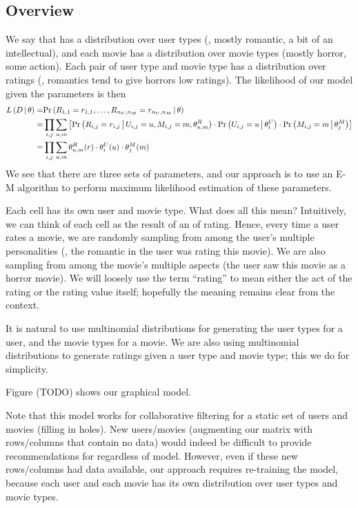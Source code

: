 \documentclass{article}
\begin{document}
\subsection{Overview}

We say that  has a distribution over user types (\eg,
mostly romantic, a bit of an intellectual), and each movie has a
distribution over movie types (mostly horror, some action). Each pair
of user type and movie type has a distribution over ratings (\eg,
romantics tend to give horrors low ratings). The likelihood of
our model given the parameters is then
\begin{align}
  {\ensuremath{ L \left( D \,\middle|\, \theta \right) }}
  =& {{\Pr \left(   R_{1,1} = r_{1,1}, \dots, R_{n_U,n_M} = r_{n_U,n_M}  \,\middle|\, 
    \theta   \right)}} \\
  =& \prod_{i,j} \sum_{u,m} \left[
    {{\Pr \left(   R_{i,j} = r_{i,j}  \,\middle|\,  U_{i,j} = u, M_{i,j} = m,
      \theta^R_{u,m}   \right)}} \cdot 
    {{\Pr \left(   U_{i,j} = u  \,\middle|\,  \theta^U_i   \right)}} \cdot
    {{\Pr \left(   M_{i,j} = m  \,\middle|\,  \theta^M_j   \right)}}
  \right] \\
  =& \prod_{i,j} \sum_{u,m}
  \theta^R_{u,m}(r) \cdot \theta^U_i(u) \cdot \theta^M_j(m)
\end{align}
We see that there are three sets of parameters, and our approach is to
use an E-M algorithm to perform maximum likelihood estimation of these
parameters.

Each cell has its own user and movie type. What does all this mean?
Intuitively, we can think of each cell as the result of an 
of rating. Hence, every time a user rates a movie, we are randomly
sampling from among the user's multiple personalities (\eg, the
romantic in the user was rating this movie). We are also sampling from
among the movie's multiple aspects (the user saw this movie as a
horror movie). We will loosely use the term ``rating'' to mean either
the act of the rating or the rating value itself; hopefully the
meaning remains clear from the context.

It is natural to use multinomial distributions for generating the user
types for a user, and the movie types for a movie. We are also using
multinomial distributions to generate ratings given a user type and
movie type; this we do for simplicity. 

Figure (TODO) shows our graphical model.

 Note that this model works for
collaborative filtering for a static set of users and movies (filling
in holes). New users/movies (augmenting our matrix with rows/columns
that contain no data) would indeed be difficult to provide
recommendations for regardless of model. However, even if these new
rows/columns had data available, our approach requires re-training the
model, because each user and each movie has its own distribution over
user types and movie types. 
\end{document}
